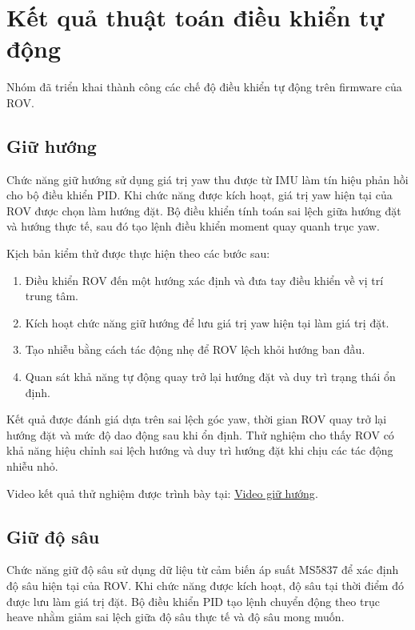 \documentclass[../DoAn.tex]{subfiles}
\begin{document}
\section{Kết quả thuật toán điều khiển tự động}

Nhóm đã triển khai thành công các chế độ điều khiển tự động trên firmware của ROV.

\subsection{Giữ hướng}

Chức năng giữ hướng sử dụng giá trị yaw thu được từ IMU làm tín hiệu phản hồi cho bộ điều khiển PID. Khi chức năng được kích hoạt, giá trị yaw hiện tại của ROV được chọn làm hướng đặt. Bộ điều khiển tính toán sai lệch giữa hướng đặt và hướng thực tế, sau đó tạo lệnh điều khiển moment quay quanh trục yaw.

Kịch bản kiểm thử được thực hiện theo các bước sau:

\begin{enumerate}
\item Điều khiển ROV đến một hướng xác định và đưa tay điều khiển về vị trí trung tâm.
\item Kích hoạt chức năng giữ hướng để lưu giá trị yaw hiện tại làm giá trị đặt.
\item Tạo nhiễu bằng cách tác động nhẹ để ROV lệch khỏi hướng ban đầu.
\item Quan sát khả năng tự động quay trở lại hướng đặt và duy trì trạng thái ổn định.
\end{enumerate}

Kết quả được đánh giá dựa trên sai lệch góc yaw, thời gian ROV quay trở lại hướng đặt và mức độ dao động sau khi ổn định. Thử nghiệm cho thấy ROV có khả năng hiệu chỉnh sai lệch hướng và duy trì hướng đặt khi chịu các tác động nhiễu nhỏ.

Video kết quả thử nghiệm được trình bày tại: \href{https://drive.google.com/file/d/11iHc4Oya20JVWQp25lEVBZ62LGkQiPMb/view?usp=sharing}{\underline{Video giữ hướng}}.

\subsection{Giữ độ sâu}

Chức năng giữ độ sâu sử dụng dữ liệu từ cảm biến áp suất MS5837 để xác định độ sâu hiện tại của ROV. Khi chức năng được kích hoạt, độ sâu tại thời điểm đó được lưu làm giá trị đặt. Bộ điều khiển PID tạo lệnh chuyển động theo trục heave nhằm giảm sai lệch giữa độ sâu thực tế và độ sâu mong muốn.
\end{document}
